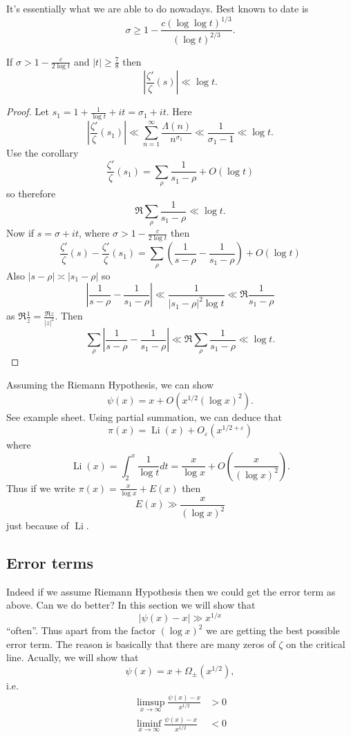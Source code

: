 \documentclass[a4paper]{article}
\theoremstyle{definition}
\begin{document}
It's essentially what we are able to do nowadays. Best known to date is
\[
  \sigma \geq 1 - \frac{c (\log \log t)^{1/3}}{(\log t)^{2/3}}.
\]

\begin{lemma}
  If \(\sigma > 1 - \frac{c}{2 \log t}\) and \(|t| \geq \frac{7}{8}\) then
  \[
    |\frac{\zeta'}{\zeta}(s)| \ll \log t.
  \]
\end{lemma}

\begin{proof}
  Let \(s_1 = 1 + \frac{1}{\log t} + it = \sigma_1 + it\). Here
  \[
    |\frac{\zeta'}{\zeta}(s_1)|
    \ll \sum_{n = 1}^\infty \frac{\Lambda(n)}{n^{\sigma_1}}
    \ll \frac{1}{\sigma_1 - 1}
    \ll \log t.
  \]
  Use the corollary
  \[
    \frac{\zeta'}{\zeta}(s_1) = \sum_\rho \frac{1}{s_1 - \rho} + O(\log t)
  \]
  so therefore
  \[
    \Re \sum_\rho \frac{1}{s_1 - \rho} \ll \log t.
  \]
  Now if \(s = \sigma + it\), where \(\sigma > 1 - \frac{c}{2 \log t}\) then
  \[
    \frac{\zeta'}{\zeta}(s) - \frac{\zeta'}{\zeta}(s_1)
    = \sum_\rho (\frac{1}{s - \rho} - \frac{1}{s_1 - \rho}) + O(\log t)
  \]
  Also \(|s - \rho| \asymp |s_1 - \rho|\) so
  \[
    |\frac{1}{s - \rho} - \frac{1}{s_1 - \rho}|
    \ll \frac{1}{|s_1 - \rho|^2 \log t}
    \ll \Re \frac{1}{s_1 - \rho}
  \]
  as \(\Re \frac{1}{z} = \frac{\Re z}{|z|^2}\). Then
  \[
    \sum_\rho |\frac{1}{s - \rho} - \frac{1}{s_1 - \rho}|
    \ll \Re \sum_\rho \frac{1}{s_1 - \rho}
    \ll \log t.
  \]
\end{proof}

Assuming the Riemann Hypothesis, we can show
\[
  \psi(x) = x + O(x^{1/2} (\log x)^2).
\]
See example sheet. Using partial summation, we can deduce that
\[
  \pi(x) = \operatorname{Li} (x) + O_\varepsilon(x^{1/2 + \varepsilon})
\]
where
\[
  \operatorname{Li} (x)
  = \int_2^x \frac{1}{\log t} dt
  = \frac{x}{\log x} + O(\frac{x}{(\log x)^2}).
\]
Thus if we write \(\pi(x) = \frac{x}{\log x} + E(x)\) then
\[
  E(x) \gg \frac{x}{(\log x)^2}
\]
just because of \(\operatorname{Li}\).

\subsection{Error terms}

Indeed if we assume Riemann Hypothesis then we could get the error term as above. Can we do better? In this section we will show that
\[
  |\psi(x) - x| \gg x^{1/x}
\]
``often''. Thus apart from the factor \((\log x)^2\) we are getting the best possible error term. The reason is basically that there are many zeros of \(\zeta\) on the critical line. Acually, we will show that
\[
  \psi(x) = x + \Omega_{\pm} (x^{1/2}),
\]
i.e.
\begin{align*}
  \limsup_{x \to \infty} \frac{\psi(x) - x}{x^{1/2}} &> 0 \\
  \liminf_{x \to \infty} \frac{\psi(x) - x}{x^{1/2}} &< 0
\end{align*}













\printindex
\end{document}
